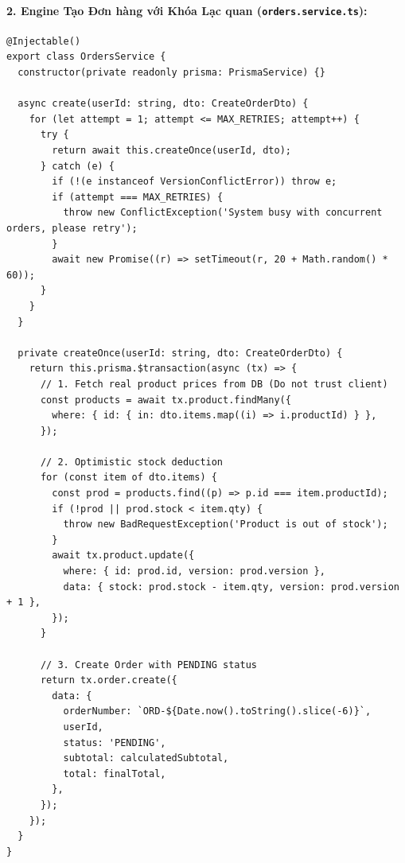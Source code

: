 \documentclass[a4paper]{article}
\begin{document}
\paragraph{2. Engine Tạo Đơn hàng với Khóa Lạc quan (\texttt{orders.service.ts}):}
\begin{lstlisting}[caption={Atomic Order Creation with Optimistic Locking}]
@Injectable()
export class OrdersService {
  constructor(private readonly prisma: PrismaService) {}

  async create(userId: string, dto: CreateOrderDto) {
    for (let attempt = 1; attempt <= MAX_RETRIES; attempt++) {
      try {
        return await this.createOnce(userId, dto);
      } catch (e) {
        if (!(e instanceof VersionConflictError)) throw e;
        if (attempt === MAX_RETRIES) {
          throw new ConflictException('System busy with concurrent orders, please retry');
        }
        await new Promise((r) => setTimeout(r, 20 + Math.random() * 60));
      }
    }
  }

  private createOnce(userId: string, dto: CreateOrderDto) {
    return this.prisma.$transaction(async (tx) => {
      // 1. Fetch real product prices from DB (Do not trust client)
      const products = await tx.product.findMany({
        where: { id: { in: dto.items.map((i) => i.productId) } },
      });
      
      // 2. Optimistic stock deduction
      for (const item of dto.items) {
        const prod = products.find((p) => p.id === item.productId);
        if (!prod || prod.stock < item.qty) {
          throw new BadRequestException('Product is out of stock');
        }
        await tx.product.update({
          where: { id: prod.id, version: prod.version },
          data: { stock: prod.stock - item.qty, version: prod.version + 1 },
        });
      }

      // 3. Create Order with PENDING status
      return tx.order.create({
        data: {
          orderNumber: `ORD-${Date.now().toString().slice(-6)}`,
          userId,
          status: 'PENDING',
          subtotal: calculatedSubtotal,
          total: finalTotal,
        },
      });
    });
  }
}
\end{lstlisting}
\end{document}
